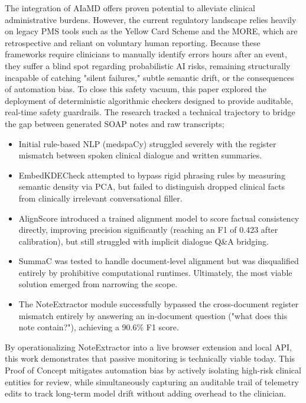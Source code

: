 \documentclass[11pt,a4paper]{article}
\begin{document}
The integration of  AIaMD offers proven potential to alleviate clinical administrative burdens. However, the current regulatory landscape relies heavily on legacy PMS tools such as the Yellow Card Scheme and the MORE, which are retrospective and reliant on voluntary human reporting. Because these frameworks require clinicians to manually identify errors hours after an event, they suffer a blind spot regarding probabilistic AI risks, remaining structurally incapable of catching "silent failures," subtle semantic drift, or the consequences of automation bias.  To close this safety vacuum, this paper explored the deployment of deterministic algorithmic checkers designed to provide auditable, real-time safety guardrails. The research tracked a technical trajectory to bridge the gap between generated SOAP notes and raw transcripts;
\begin{itemize}

    \item Initial rule-based NLP (medspaCy) struggled severely with the register mismatch between spoken clinical dialogue and written summaries.
    \item  EmbedKDECheck attempted to bypass rigid phrasing rules by measuring semantic density via PCA, but failed to distinguish dropped clinical facts from clinically irrelevant conversational filler.

    \item AlignScore introduced a trained alignment model to score factual consistency directly, improving precision significantly (reaching an F1 of 0.423 after calibration), but still struggled with implicit dialogue Q\&A bridging. 

    \item SummaC was tested to handle document-level alignment but was disqualified entirely by prohibitive computational runtimes.  Ultimately, the most viable solution emerged from narrowing the scope.
    \item The NoteExtractor module successfully bypassed the cross-document register mismatch entirely by answering an in-document question ("what does this note contain?"), achieving a 90.6\% F1 score.
\end{itemize}
 By operationalizing NoteExtractor into a live browser extension and local API, this work demonstrates that passive monitoring is technically viable today. This Proof of Concept mitigates automation bias by actively isolating high-risk clinical entities for review, while simultaneously capturing an auditable trail of telemetry edits to track long-term model drift without adding overhead to the clinician.
\end{document}
